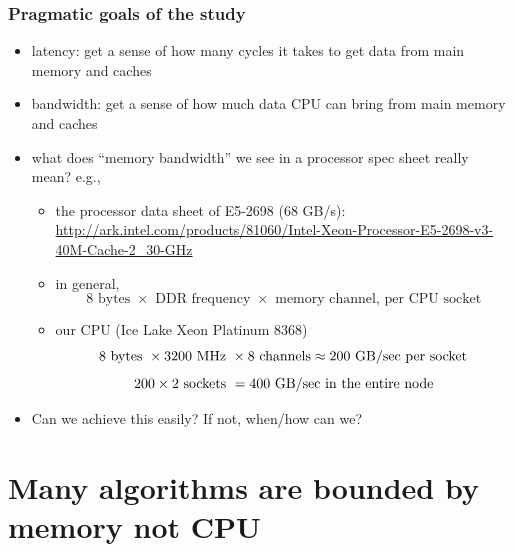 \documentclass[12pt,dvipdfmx]{beamer}
\newcommand{\ao}[1]{{\color{blue}#1}}
\begin{document}
\begin{frame}
\frametitle{Pragmatic goals of the study}
\begin{itemize}

\item<1-> \ao{latency:} get a sense of how many cycles it takes to get data
  from main memory and caches

\item<2-> \ao{bandwidth:} get a sense of how much data CPU can bring from main
  memory and caches

\item<3-> what does ``memory bandwidth'' we see in a processor spec sheet really mean? e.g.,

  \begin{itemize}
  \item the processor data sheet of E5-2698 (68 GB/s):
    {\tiny\url{http://ark.intel.com/products/81060/Intel-Xeon-Processor-E5-2698-v3-40M-Cache-2_30-GHz}}
  \item in general,
    \[ 8 \mbox{ bytes } \times \mbox{ DDR frequency } \times
      \mbox{ memory channel, per CPU socket} \]
    
  \item our CPU (Ice Lake Xeon Platinum 8368)
    \[ 8 \mbox{ bytes } \times 3200 \mbox{ MHz } \times 8 \mbox{ channels}
      \approx \ao{200 \mbox{ GB/sec per socket}} \]
    \[ 200 \times 2 \mbox{ sockets } =
      \ao{400 \mbox{ GB/sec in the entire node}} \]

  \end{itemize}

\item<4-> Can we achieve this easily?  If not, when/how can we?
\end{itemize}
\end{frame}

\section{Many algorithms are bounded by memory not CPU}
\end{document}
